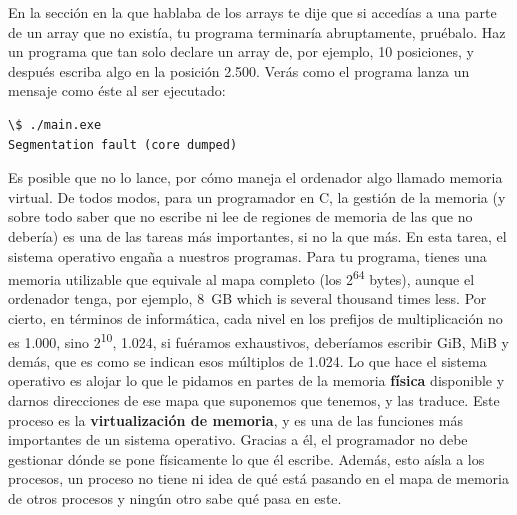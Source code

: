 \documentclass[a4paper]{article}
\begin{document}
En la sección en la que hablaba de los arrays te dije que si accedías a una
parte de un array que no existía, tu programa terminaría abruptamente, pruébalo.
Haz un programa que tan solo declare un array de, por ejemplo, 10 posiciones, y
después escriba algo en la posición 2.500. Verás como el programa lanza un
mensaje como éste al ser ejecutado:


\noindent
\begin{minipage}[H]{\linewidth}
\mbox{}
\begin{lstlisting}[style=terminalStyle]
\$ ./main.exe
Segmentation fault (core dumped)
\end{lstlisting}
\end{minipage}


Es posible que no lo lance, por cómo maneja el ordenador algo llamado
memoria virtual. De todos
modos, para un programador en C, la gestión de la memoria (y sobre todo
saber que no escribe ni lee de regiones de memoria de las que no debería) es
una de las tareas más importantes, si no la que más. En esta tarea, el sistema
operativo engaña a nuestros programas. Para tu programa, tienes una memoria
utilizable que equivale al mapa completo (los 2\textsuperscript{64} bytes),
aunque el ordenador tenga, por ejemplo, 8~GB which is several thousand times
less. Por cierto, en términos
de informática, cada nivel en los prefijos de multiplicación no es 1.000,
sino 2\textsuperscript{10}, 1.024, si fuéramos
exhaustivos, deberíamos escribir GiB, MiB y demás, que es como se indican
esos múltiplos de 1.024. Lo que hace el sistema operativo es
alojar lo que le pidamos en partes de la memoria \textbf{física} disponible
y darnos direcciones de ese mapa que suponemos que tenemos, y las traduce.
Este proceso es la \textbf{virtualización de memoria}, y es una de las
funciones más importantes de un sistema operativo. Gracias a él, el programador
no debe gestionar dónde se pone físicamente lo que él escribe. Además, esto
aísla a los procesos, un proceso no tiene ni idea de qué está pasando en el mapa
de memoria de otros procesos y ningún otro sabe qué pasa en este.
\end{document}
